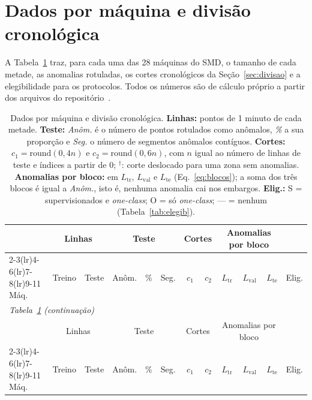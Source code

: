 \section{Dados por máquina e divisão cronológica}\label{apx:maquinas}

A Tabela~\ref{tab:maquinas} traz, para cada uma das 28 máquinas do SMD, o tamanho de cada metade, as anomalias
rotuladas, os cortes cronológicos da Seção~\ref{sec:divisao} e a elegibilidade para os protocolos. Todos os
números são de cálculo próprio a partir dos arquivos do repositório~\cite{omnianomaly}.

{\footnotesize
\setlength{\tabcolsep}{3pt}
\begin{longtable}{@{}lrrrrrrrrrrc@{}}
\caption{Dados por máquina e divisão cronológica. \textbf{Linhas:} pontos de 1 minuto de cada metade.
\textbf{Teste:} \emph{Anôm.} é o número de pontos rotulados como anômalos, \emph{\%} a sua proporção e
\emph{Seg.} o número de segmentos anômalos contíguos. \textbf{Cortes:} $c_1=\mathrm{round}(0{,}4n)$ e
$c_2=\mathrm{round}(0{,}6n)$, com $n$ igual ao número de linhas de teste e índices a partir de 0;
$^{\dagger}$: corte deslocado para uma zona sem anomalias. \textbf{Anomalias por bloco:} em $L_{\mathrm{tr}}$,
$L_{\mathrm{val}}$ e $L_{\mathrm{te}}$ (Eq.~\ref{eq:blocos}); a soma dos três blocos é igual a \emph{Anôm.},
isto é, nenhuma anomalia cai nos embargos. \textbf{Elig.:} S = supervisionados e \emph{one-class};
O = só \emph{one-class}; --- = nenhum (Tabela~\ref{tab:elegib}).}
\label{tab:maquinas}\\
\toprule
 & \multicolumn{2}{c}{Linhas} & \multicolumn{3}{c}{Teste} & \multicolumn{2}{c}{Cortes} &
 \multicolumn{3}{c}{Anomalias por bloco} & \\
\cmidrule(lr){2-3}\cmidrule(lr){4-6}\cmidrule(lr){7-8}\cmidrule(lr){9-11}
Máq. & Treino & Teste & Anôm. & \% & Seg. & $c_1$ & $c_2$ & $L_{\mathrm{tr}}$ & $L_{\mathrm{val}}$ &
$L_{\mathrm{te}}$ & Elig.\\
\midrule
\endfirsthead
\multicolumn{12}{l}{\emph{Tabela~\ref{tab:maquinas} (continuação)}}\\
\toprule
 & \multicolumn{2}{c}{Linhas} & \multicolumn{3}{c}{Teste} & \multicolumn{2}{c}{Cortes} &
 \multicolumn{3}{c}{Anomalias por bloco} & \\
\cmidrule(lr){2-3}\cmidrule(lr){4-6}\cmidrule(lr){7-8}\cmidrule(lr){9-11}
Máq. & Treino & Teste & Anôm. & \% & Seg. & $c_1$ & $c_2$ & $L_{\mathrm{tr}}$ & $L_{\mathrm{val}}$ &
$L_{\mathrm{te}}$ & Elig.\\
\midrule
\endhead
\midrule

\end{longtable}}
